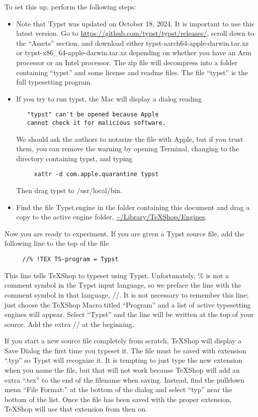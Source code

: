 \documentclass[11pt, oneside]{article}   	%
\begin{document}
To set this up, perform the following steps:
\begin{itemize}
\item Note that Typst was updated on October 18, 2024. It is important to use this latest version. Go to  \url{https://github.com/typst/typst/releases/}, scroll down to the ``Assets'' section, and download either typst-aarch64-apple-darwin.tar.xz or typst-x86\_64-apple-darwin.tar.xz depending on whether you have an Arm processor or an Intel processor. The zip file will decompress into a folder containing  ``typst'' and some license and readme files. The file ``typst'' is the full typesetting program.
\item
If you try to run typst, the Mac will display a dialog reading
\begin{verbatim}
   "typst" can't be opened because Apple 
   cannot check it for malicious software.
\end{verbatim}
We should ask the authors to notarize the file with Apple, but if you trust them, you can remove the
warning by opening Terminal, changing to the directory containing typst, and typing
\begin{verbatim}
     xattr -d com.apple.quarantine typst
\end{verbatim}
Then drag typst to /usr/local/bin.
\item Find the file Typst.engine in the folder containing this document 
and drag a copy to the active engine folder, \url{~/Library/TeXShop/Engines}.
\end{itemize}
\vspace{.2 in}

Now you are ready to experiment. If you are given a Typst source file, add the following line to the top of the file
\begin{verbatim}
     //% !TEX TS-program = Typst
\end{verbatim}
This line tells TeXShop to typeset using Typst. Unfortunately, \% is not a comment symbol in the Typst input language, so we preface the line with the comment symbol in that language, //. It is not necessary to remember this line; just
choose the TeXShop Macro titled  ``Program'' and a list of active typesetting engines will appear. Select ``Typst'' and
the line will be written at the top of your source. Add the extra // at the beginning.

If  you start a new source file completely from scratch,  TeXShop will display a Save Dialog the first time you typeset it. The file must be saved with extension ``.typ'' so Typst will recognize it.  It is tempting to just type the new extension when you name the file, but that will not work because TeXShop will add an extra ``.tex'' to the end of the filename when saving. Instead, find the pulldown menu ``File Format:'' at the bottom of the dialog and select ``typ'' near the bottom of the list. Once the file has been saved with the proper extension, TeXShop will use that extension from then on. 
\end{document}
